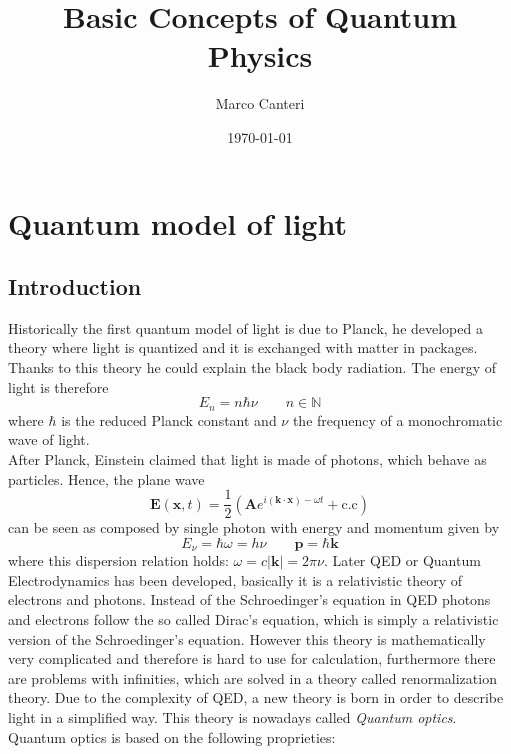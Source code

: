 \documentclass[12pt]{article}
\title{\textbf{Basic Concepts of Quantum Physics}}
\author{Marco Canteri}
\date{\today}
\theoremstyle{plain}
\newcommand{\N}{\mathbb{N}}
\renewcommand{\k}{\mathbf{k}}
\newcommand{\x}{\mathbf{x}}
\newcommand{\p}{\mathbf{p}}
\theoremstyle{definition}
\theoremstyle{remark}
\begin{document}
\maketitle
\section{Quantum model of light}
\subsection{Introduction}
Historically the first quantum model of light is due to Planck, he developed a theory where light is quantized and it is exchanged with matter in packages. Thanks to this theory he could explain the black body radiation. The energy of light is therefore
\begin{equation} E_n = n\hbar \nu \qquad n\in \N\end{equation}
where $\hbar$ is the reduced Planck constant and $\nu$ the frequency of a monochromatic wave of light.\\
After Planck, Einstein claimed that light is made of photons, which behave as particles. Hence, the plane wave
\begin{equation}\mathbf{E}(\x,t) = \frac{1}{2}\left(\mathbf{A}e^{i(\k\cdot \x)-\omega t} + \text{c.c}\right)\end{equation}
can be seen as composed by single photon with energy and momentum given by
\begin{equation}E_\nu = \hbar \omega = h\nu \qquad \p = \hbar \k\end{equation}
where this dispersion relation holds: $\omega = c |\k| = 2\pi \nu $. Later QED or Quantum Electrodynamics has been developed, basically it is a relativistic theory of electrons and photons. Instead of the Schroedinger's equation in QED photons and electrons follow the so called Dirac's equation, which is simply a relativistic version of the Schroedinger's equation. However this theory is mathematically very complicated and therefore is hard to use for calculation, furthermore there are problems with infinities, which are solved in a theory called renormalization theory. Due to the complexity of QED, a new theory is born in order to describe light in a simplified way. This theory is nowadays called \emph{Quantum optics}.\\
Quantum optics is based on the following proprieties:
\end{document}
